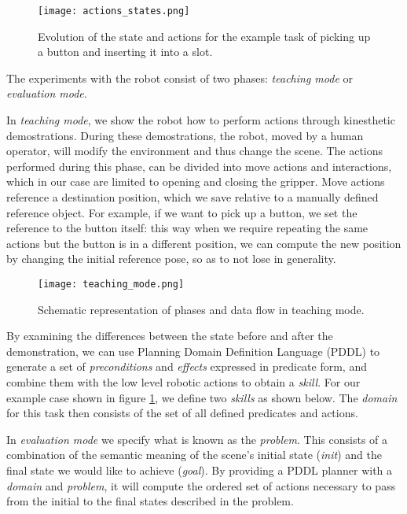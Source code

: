 \begin{figure}[ht]
    \texttt{[image: actions\_states.png]}
    \caption{Evolution of the state and actions for the example task of picking up a button and inserting it into a slot.}
    \label{predicatesevolutions}
\end{figure}

The experiments with the robot consist of two phases: \emph{teaching mode} or \emph{evaluation mode}.

In \emph{teaching mode}, we show the robot how to perform actions through kinesthetic demostrations. During these demostrations, the robot, moved by a human operator, will modify the environment and thus change the scene. The actions performed during this phase, can be divided into move actions and interactions, which in our case are limited to opening and closing the gripper. Move actions reference a destination position, which we save relative to a manually defined reference object. For example, if we want to pick up a button, we set the reference to the button itself: this way when we require repeating the same actions but the button is in a different position, we can compute the new position by changing the initial reference pose, so as to not lose in generality.

\begin{figure}
    \texttt{[image: teaching\_mode.png]}
    \caption{Schematic representation of phases and data flow in teaching mode.}
\end{figure}

By examining the differences between the state before and after the demonstration, we can use Planning Domain Definition Language (PDDL) \cite{pddl} to generate a set of \emph{preconditions} and \emph{effects} expressed in predicate form, and combine them with the low level robotic actions to obtain a \emph{skill}. For our example case shown in figure \ref{predicatesevolutions}, we define two \emph{skills} as shown below. The \emph{domain} for this task then consists of the set of all defined predicates and actions.

In \emph{evaluation mode} we specify what is known as the \emph{problem}. This consists of a combination of the semantic meaning of the scene's initial state (\emph{init}) and the final state we would like to achieve (\emph{goal}). By providing a PDDL planner with a \emph{domain} and \emph{problem}, it will compute the ordered set of actions necessary to pass from the initial to the final states described in the problem.


